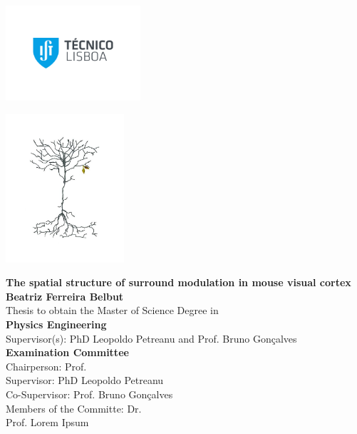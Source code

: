 \setcounter{page}{1} 


\thispagestyle{empty}
\begin{flushleft}~\\ \vspace{-12mm} \hspace{-12mm}  \includegraphics[width=50mm]{Figures/Cover/istnewlogo.pdf} 
\vspace{10mm}
\\ \begin{center} \includegraphics[height=55mm]{Figures/Cover/coverimage.jpg}  \end{center} %
 \vspace{5mm}
\centering
\LARGE \textbf{The spatial structure of surround modulation in mouse visual cortex}
\\ \vspace{10mm}
 \vspace{15mm}
\Large \textbf{Beatriz Ferreira Belbut} \\
\vspace{12mm}
\large Thesis to obtain the Master of Science Degree in
\\ \vspace{2mm}
\LARGE \textbf{Physics Engineering}
\\ \vspace{10mm}
\large Supervisor(s): PhD Leopoldo Petreanu and Prof. Bruno Gonçalves
\\ \vspace{15mm}
\Large \textbf{Examination Committee}
\\ \vspace{5mm}
\large Chairperson:	Prof.  \\
\large Supervisor: PhD Leopoldo Petreanu\\
\large Co-Supervisor: Prof. Bruno Gonçalves \\
\large Members of the Committe: Dr.  \\
Prof. Lorem Ipsum
 

\end{flushleft}
